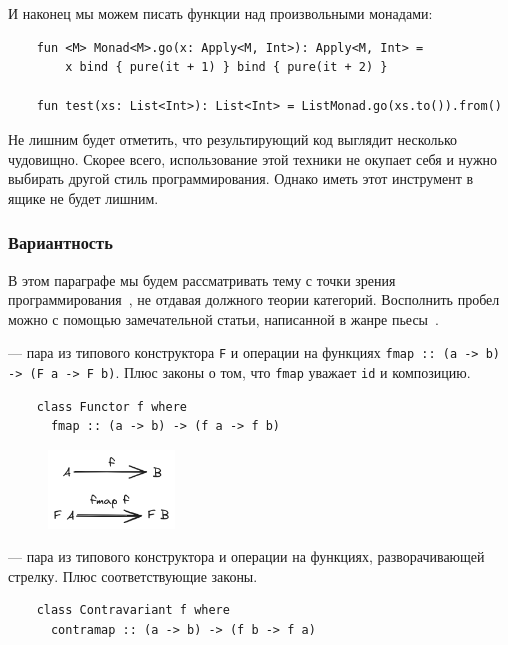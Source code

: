 И наконец мы можем писать функции над произвольными монадами:
\begin{verbatim}
    fun <M> Monad<M>.go(x: Apply<M, Int>): Apply<M, Int> =
        x bind { pure(it + 1) } bind { pure(it + 2) }

    fun test(xs: List<Int>): List<Int> = ListMonad.go(xs.to()).from()
\end{verbatim}

Не лишним будет отметить, что результирующий код выглядит несколько чудовищно.
Скорее всего, использование этой техники не окупает себя и нужно выбирать другой стиль программирования.
Однако иметь этот инструмент в ящике не будет лишним.

\subsubsection{Вариантность}

В этом параграфе мы будем рассматривать тему с точки зрения программирования~\cite[глава 3]{maguire-types}, не отдавая должного теории категорий.
Восполнить пробел можно с помощью замечательной статьи, написанной в жанре пьесы~\cite{hinze2012functional}.

 --- пара из типового конструктора \texttt{F} и операции на функциях \texttt{fmap :: (a -> b) -> (F a -> F b)}.
Плюс законы о том, что \texttt{fmap} уважает \texttt{id} и композицию.

\begin{verbatim}
    class Functor f where
      fmap :: (a -> b) -> (f a -> f b)
\end{verbatim}

\begin{figure}[H]
    \centering
    \includegraphics[width=0.3\textwidth]{figs/functor}
\end{figure}

 --- пара из типового конструктора и операции на функциях, разворачивающей стрелку.
Плюс соответствующие законы.

\begin{verbatim}
    class Contravariant f where
      contramap :: (a -> b) -> (f b -> f a)
\end{verbatim}

